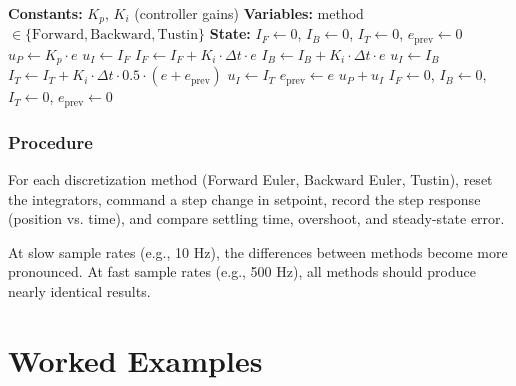 \begin{algorithm}
\caption{Comparing Discretization Methods for PI Control}
\label{alg:discretization_compare}
\begin{algorithmic}[1]
\State \textbf{Constants:} $K_p$, $K_i$ (controller gains)
\State \textbf{Variables:} method $\in \{\text{Forward}, \text{Backward}, \text{Tustin}\}$
\State \textbf{State:} $I_F \gets 0$, $I_B \gets 0$, $I_T \gets 0$, $e_{\text{prev}} \gets 0$
\State
{}
    \State $u_P \gets K_p \cdot e$ 
    \State
        \State $u_I \gets I_F$ 
        \State $I_F \gets I_F + K_i \cdot \Delta t \cdot e$ 
        \State $I_B \gets I_B + K_i \cdot \Delta t \cdot e$ 
        \State $u_I \gets I_B$ 
        \State $I_T \gets I_T + K_i \cdot \Delta t \cdot 0.5 \cdot (e + e_{\text{prev}})$ 
        \State $u_I \gets I_T$
        \State $e_{\text{prev}} \gets e$
    \EndIf
    \State
    \State \Return $u_P + u_I$
\EndFunction
\State
{}
    \State $I_F \gets 0$, $I_B \gets 0$, $I_T \gets 0$, $e_{\text{prev}} \gets 0$
\EndProcedure
\end{algorithmic}
\end{algorithm}

\subsubsection{Procedure}

For each discretization method (Forward Euler, Backward Euler, Tustin), reset the integrators, command a step change in setpoint, record the step response (position vs. time), and compare settling time, overshoot, and steady-state error.

At slow sample rates (e.g., 10 Hz), the differences between methods become more pronounced. At fast sample rates (e.g., 500 Hz), all methods should produce nearly identical results.

\section{Worked Examples}
\label{sec:examples}

